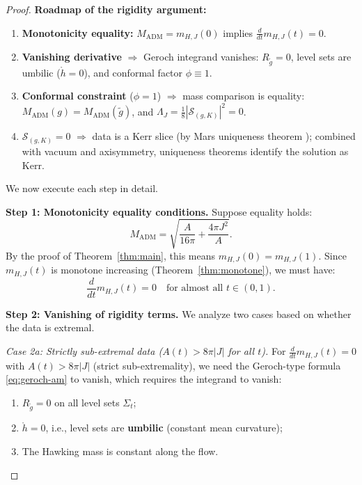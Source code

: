 \documentclass[12pt]{article}
\theoremstyle{plain}
\theoremstyle{definition}
\theoremstyle{remark}
\newcommand{\ADM}{\mathrm{ADM}}
\newcommand{\tg}{\tilde{g}}
\begin{document}
\begin{proof}
\textbf{Roadmap of the rigidity argument:}
\begin{enumerate}
    \item \textbf{Monotonicity equality:} $M_{\ADM} = m_{H,J}(0)$ implies $\frac{d}{dt}m_{H,J}(t) = 0$.
    \item \textbf{Vanishing derivative} $\Rightarrow$ Geroch integrand vanishes: $R_{\tilde{g}} = 0$, level sets are umbilic ($\mathring{h} = 0$), and conformal factor $\phi \equiv 1$.
    \item \textbf{Conformal constraint} ($\phi = 1$) $\Rightarrow$ mass comparison is equality: $M_{\ADM}(g) = M_{\ADM}(\tilde{g})$, and $\Lambda_J = \frac{1}{8}|\mathcal{S}_{(g,K)}|^2 = 0$.
    \item \textbf{$\mathcal{S}_{(g,K)} = 0$} $\Rightarrow$ data is a Kerr slice (by Mars uniqueness theorem \cite{mars2009}); combined with vacuum and axisymmetry, uniqueness theorems identify the solution as Kerr.
\end{enumerate}
We now execute each step in detail.

\textbf{Step 1: Monotonicity equality conditions.}
Suppose equality holds:
\[
M_{\ADM} = \sqrt{\frac{A}{16\pi} + \frac{4\pi J^2}{A}}.
\]
By the proof of Theorem~\ref{thm:main}, this means $m_{H,J}(0) = m_{H,J}(1)$. Since $m_{H,J}(t)$ is monotone increasing (Theorem~\ref{thm:monotone}), we must have:
\[
\frac{d}{dt} m_{H,J}(t) = 0 \quad \text{for almost all } t \in (0, 1).
\]

\textbf{Step 2: Vanishing of rigidity terms.}
We analyze two cases based on whether the data is extremal.

\textit{Case 2a: Strictly sub-extremal data ($A(t) > 8\pi|J|$ for all $t$).}
For $\frac{d}{dt} m_{H,J}(t) = 0$ with $A(t) > 8\pi|J|$ (strict sub-extremality), we need the Geroch-type formula \eqref{eq:geroch-am} to vanish, which requires the integrand to vanish:
\begin{enumerate}
    \item $R_{\tg} = 0$ on all level sets $\Sigma_t$;
    \item $\mathring{h} = 0$, i.e., level sets are \textbf{umbilic} (constant mean curvature);
    \item The Hawking mass is constant along the flow.
\end{enumerate}


\end{proof}
\end{document}
